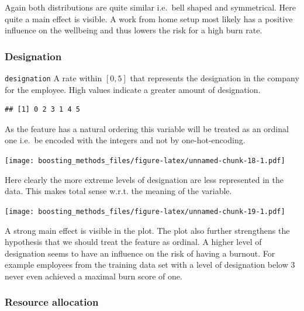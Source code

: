 \documentclass[
]{book}
\newenvironment{Shaded}{\begin{snugshade}}{\end{snugshade}}
\newcommand{\CommentTok}[1]{\textcolor[rgb]{0.56,0.35,0.01}{\textit{#1}}}
\newcommand{\FunctionTok}[1]{\textcolor[rgb]{0.00,0.00,0.00}{#1}}
\newcommand{\NormalTok}[1]{#1}
\newcommand{\SpecialCharTok}[1]{\textcolor[rgb]{0.00,0.00,0.00}{#1}}
\begin{document}
Again both distributions are quite similar i.e.~bell shaped and symmetrical. Here quite a main effect is visible. A work from home setup most likely has a positive influence on the wellbeing and thus lowers the risk for a high burn rate.

\hypertarget{designation}{%
\subsubsection{Designation}\label{designation}}

\texttt{designation} A rate within \([0,5]\) that represents the designation in the company for the employee. High values indicate a greater amount of designation.

\begin{Shaded}
\end{Shaded}

\begin{verbatim}
## [1] 0 2 3 1 4 5
\end{verbatim}

As the feature has a natural ordering this variable will be treated as an ordinal one i.e.~be encoded with the integers and not by one-hot-encoding.

\texttt{[image: boosting\_methods\_files/figure-latex/unnamed-chunk-18-1.pdf]}

Here clearly the more extreme levels of designation are less represented in the data. This makes total sense w.r.t. the meaning of the variable.

\texttt{[image: boosting\_methods\_files/figure-latex/unnamed-chunk-19-1.pdf]}

A strong main effect is visible in the plot. The plot also further strengthens the hypothesis that we should treat the feature as ordinal. A higher level of designation seems to have an influence on the risk of having a burnout. For example employees from the training data set with a level of designation below 3 never even achieved a maximal burn score of one.

\hypertarget{resource-allocation}{%
\subsubsection{Resource allocation}\label{resource-allocation}}
\end{document}
